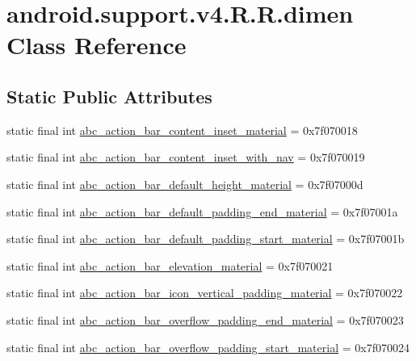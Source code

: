 \hypertarget{classandroid_1_1support_1_1v4_1_1_r_1_1dimen}{
\section{android.support.v4.R.R.dimen Class Reference}
\label{classandroid_1_1support_1_1v4_1_1_r_1_1dimen}
}
\subsection*{Static Public Attributes}
\begin{CompactItemize}
\item 
static final int \hyperlink{classandroid_1_1support_1_1v4_1_1_r_1_1dimen_8adb81f207d6e9fbe3a1b4b226d696ee}{abc\_\-action\_\-bar\_\-content\_\-inset\_\-material} = 0x7f070018
\item 
static final int \hyperlink{classandroid_1_1support_1_1v4_1_1_r_1_1dimen_716f009bafea7acee086f91ba057c966}{abc\_\-action\_\-bar\_\-content\_\-inset\_\-with\_\-nav} = 0x7f070019
\item 
static final int \hyperlink{classandroid_1_1support_1_1v4_1_1_r_1_1dimen_38f163ec1579b8bffcfd3389ddfeddb7}{abc\_\-action\_\-bar\_\-default\_\-height\_\-material} = 0x7f07000d
\item 
static final int \hyperlink{classandroid_1_1support_1_1v4_1_1_r_1_1dimen_e4bc62e486996fd813f9996822f104aa}{abc\_\-action\_\-bar\_\-default\_\-padding\_\-end\_\-material} = 0x7f07001a
\item 
static final int \hyperlink{classandroid_1_1support_1_1v4_1_1_r_1_1dimen_0f1d1fe1a156b9a25b6cb8ac196705b4}{abc\_\-action\_\-bar\_\-default\_\-padding\_\-start\_\-material} = 0x7f07001b
\item 
static final int \hyperlink{classandroid_1_1support_1_1v4_1_1_r_1_1dimen_8b5b718fe0949b7874b5a85a1332e8cd}{abc\_\-action\_\-bar\_\-elevation\_\-material} = 0x7f070021
\item 
static final int \hyperlink{classandroid_1_1support_1_1v4_1_1_r_1_1dimen_6e2842869d52437dc82fdbc0f30a18e6}{abc\_\-action\_\-bar\_\-icon\_\-vertical\_\-padding\_\-material} = 0x7f070022
\item 
static final int \hyperlink{classandroid_1_1support_1_1v4_1_1_r_1_1dimen_831d2951393d1f3c1f85b2bfee002a33}{abc\_\-action\_\-bar\_\-overflow\_\-padding\_\-end\_\-material} = 0x7f070023
\item 
static final int \hyperlink{classandroid_1_1support_1_1v4_1_1_r_1_1dimen_5f264e97eedb0c70c50129ca9bcf6b82}{abc\_\-action\_\-bar\_\-overflow\_\-padding\_\-start\_\-material} = 0x7f070024

\end{CompactItemize}
